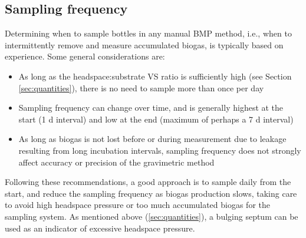 \documentclass[]{article}
\begin{document}
\subsection{Sampling frequency}
\label{sec:freq}

Determining when to sample bottles in any manual BMP method, i.e., when to intermittently remove and measure accumulated biogas, is typically based on experience. 
Some general considerations are:
\begin{itemize}
  \item As long as the headspace:substrate VS ratio is sufficiently high (see Section \ref{sec:quantities}), there is no need to sample more than once per day
  \item Sampling frequency can change over time, and is generally highest at the start (1 d interval) and low at the end (maximum of perhaps a 7 d interval)
  \item As long as biogas is not lost before or during measurement due to leakage resulting from long incubation intervals, sampling frequency does not strongly affect accuracy or precision of the gravimetric method
\end{itemize}

Following these recommendations, a good approach is to sample daily from the start, and reduce the sampling frequency as biogas production slows, taking care to avoid high headspace pressure or too much accumulated biogas for the sampling system.
As mentioned above (\ref{sec:quantities}), a bulging septum can be used as an indicator of excessive headspace pressure.
\end{document}
